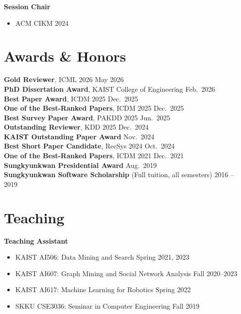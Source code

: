 \documentclass[11pt, letterpaper]{article}
\newcommand{\cvdate}[1]{{\small\color{MUTED}#1}}
\begin{document}
{\vspace{0.4em}
\textbf{Session Chair} 
\begin{itemize}[leftmargin=1.5em,itemsep=0em,parsep=0em,topsep=0.3em]
    \item ACM CIKM \hfill \cvdate{2024}
\end{itemize}

\newpage
\section*{Awards \& Honors}

\textbf{Gold Reviewer}, ICML 2026 \hfill \cvdate{May 2026}\\
\textbf{PhD Dissertation Award}, KAIST College of Engineering \hfill \cvdate{Feb.\ 2026}\\
\textbf{Best Paper Award}, ICDM 2025 \hfill \cvdate{Dec.\ 2025}\\
\textbf{One of the Best-Ranked Papers}, ICDM 2025 \hfill \cvdate{Dec.\ 2025}\\
\textbf{Best Survey Paper Award}, PAKDD 2025 \hfill \cvdate{Jun.\ 2025}\\
\textbf{Outstanding Reviewer}, KDD 2025 \hfill \cvdate{Dec.\ 2024}\\
\textbf{KAIST Outstanding Paper Award} \hfill \cvdate{Nov.\ 2024}\\
\textbf{Best Short Paper Candidate}, RecSys 2024 \hfill \cvdate{Oct.\ 2024}\\
\textbf{One of the Best-Ranked Papers}, ICDM 2021 \hfill \cvdate{Dec.\ 2021}\\
\textbf{Sungkyunkwan Presidential Award} \hfill \cvdate{Aug.\ 2019}\\
\textbf{Sungkyunkwan Software Scholarship} (Full tuition, all semesters) \hfill \cvdate{2016 -- 2019}

\vspace{5pt}
\section*{Teaching}

\textbf{Teaching Assistant}
\begin{itemize}[leftmargin=1.5em,itemsep=0em,parsep=0em,topsep=0.3em]
    \item KAIST AI506: Data Mining and Search \hfill \cvdate{Spring 2021, 2023}
    \item KAIST AI607: Graph Mining and Social Network Analysis \hfill \cvdate{Fall 2020--2023}
    \item KAIST AI617: Machine Learning for Robotics \hfill \cvdate{Spring 2022}
    \item SKKU CSE3036: Seminar in Computer Engineering \hfill \cvdate{Fall 2019}
\end{itemize}

}
\end{document}
